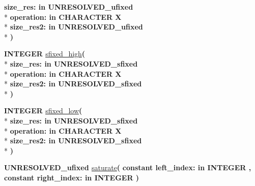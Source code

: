 \begin{DoxyCompactItemize}
{\bfseries \textcolor{vhdlchar}{size\+\_\+res\+: }\textcolor{stringliteral}{in }\textcolor{vhdlchar}{U\+N\+R\+E\+S\+O\+L\+V\+E\+D\+\_\+ufixed}}\\*
{\bfseries \textcolor{vhdlchar}{operation\+: }\textcolor{stringliteral}{in }\textcolor{vhdlchar}{C\+H\+A\+R\+A\+C\+T\+E\+R   \textquotesingle{}\+X\textquotesingle{}}}\\*
{\bfseries \textcolor{vhdlchar}{size\+\_\+res2\+: }\textcolor{stringliteral}{in }\textcolor{vhdlchar}{U\+N\+R\+E\+S\+O\+L\+V\+E\+D\+\_\+ufixed}}\\*
{\bfseries  )} 
\item 
{\bfseries {\bfseries \textcolor{comment}{I\+N\+T\+E\+G\+E\+R}\textcolor{vhdlchar}{ }}} \hyperlink{class__fixed__pkg_a2eb78ffde3bf4ab8b16c47a3535d07ea}{sfixed\+\_\+high}{\bfseries  ( }\\*
{\bfseries \textcolor{vhdlchar}{size\+\_\+res\+: }\textcolor{stringliteral}{in }\textcolor{vhdlchar}{U\+N\+R\+E\+S\+O\+L\+V\+E\+D\+\_\+sfixed}}\\*
{\bfseries \textcolor{vhdlchar}{operation\+: }\textcolor{stringliteral}{in }\textcolor{vhdlchar}{C\+H\+A\+R\+A\+C\+T\+E\+R   \textquotesingle{}\+X\textquotesingle{}}}\\*
{\bfseries \textcolor{vhdlchar}{size\+\_\+res2\+: }\textcolor{stringliteral}{in }\textcolor{vhdlchar}{U\+N\+R\+E\+S\+O\+L\+V\+E\+D\+\_\+sfixed}}\\*
{\bfseries  )} 
\item 
{\bfseries {\bfseries \textcolor{comment}{I\+N\+T\+E\+G\+E\+R}\textcolor{vhdlchar}{ }}} \hyperlink{class__fixed__pkg_a5c29a132b64790ae25761495b4c72d13}{sfixed\+\_\+low}{\bfseries  ( }\\*
{\bfseries \textcolor{vhdlchar}{size\+\_\+res\+: }\textcolor{stringliteral}{in }\textcolor{vhdlchar}{U\+N\+R\+E\+S\+O\+L\+V\+E\+D\+\_\+sfixed}}\\*
{\bfseries \textcolor{vhdlchar}{operation\+: }\textcolor{stringliteral}{in }\textcolor{vhdlchar}{C\+H\+A\+R\+A\+C\+T\+E\+R   \textquotesingle{}\+X\textquotesingle{}}}\\*
{\bfseries \textcolor{vhdlchar}{size\+\_\+res2\+: }\textcolor{stringliteral}{in }\textcolor{vhdlchar}{U\+N\+R\+E\+S\+O\+L\+V\+E\+D\+\_\+sfixed}}\\*
{\bfseries  )} 
\item 
{\bfseries {\bfseries \textcolor{vhdlchar}{U\+N\+R\+E\+S\+O\+L\+V\+E\+D\+\_\+ufixed}\textcolor{vhdlchar}{ }}} \hyperlink{class__fixed__pkg_ad69f6265ecabea4646226a786cdf93e0}{saturate}{\bfseries  ( }{\bfseries {\bfseries \textcolor{keywordflow}{constant}\textcolor{vhdlchar}{ }}\textcolor{vhdlchar}{left\+\_\+index\+: }\textcolor{stringliteral}{in }{\bfseries \textcolor{comment}{I\+N\+T\+E\+G\+E\+R}\textcolor{vhdlchar}{ }}}{\bfseries  , {\bfseries \textcolor{keywordflow}{constant}\textcolor{vhdlchar}{ }}\textcolor{vhdlchar}{right\+\_\+index\+: }\textcolor{stringliteral}{in }{\bfseries \textcolor{comment}{I\+N\+T\+E\+G\+E\+R}\textcolor{vhdlchar}{ }}}{\bfseries  )} 

\end{DoxyCompactItemize}
